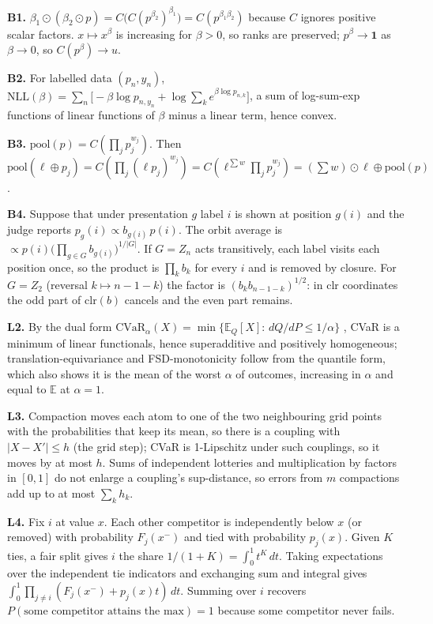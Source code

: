 \documentclass[11pt]{article}
\theoremstyle{definition}
\begin{document}
\textbf{B1.} $\beta_1\odot(\beta_2\odot p)=C\bigl(C(p^{\beta_2})^{\beta_1}\bigr)=C(p^{\beta_1\beta_2})$
because $C$ ignores positive scalar factors. $x\mapsto x^\beta$ is increasing for $\beta>0$, so
ranks are preserved; $p^\beta\to\mathbf 1$ as $\beta\to0$, so $C(p^\beta)\to u$.

\textbf{B2.} For labelled data $(p_n,y_n)$,
$\mathrm{NLL}(\beta)=\sum_n\bigl[-\beta\log p_{n,y_n}+\log\sum_k e^{\beta\log p_{n,k}}\bigr]$, a sum of
log-sum-exp functions of linear functions of $\beta$ minus a linear term, hence convex.

\textbf{B3.} $\mathrm{pool}(p)=C(\prod_j p_j^{w_j})$. Then
$\mathrm{pool}(\ell\oplus p_j)=C(\prod_j(\ell p_j)^{w_j})=C(\ell^{\sum w}\prod_j p_j^{w_j})
=(\sum w)\odot\ell\oplus\mathrm{pool}(p)$.

\textbf{B4.} Suppose that under presentation $g$ label $i$ is shown at position $g(i)$ and the
judge reports $p_g(i)\propto b_{g(i)}\,p(i)$. The orbit average is
$\propto p(i)\bigl(\prod_{g\in G}b_{g(i)}\bigr)^{1/|G|}$. If $G=Z_n$ acts transitively, each label
visits each position once, so the product is $\prod_k b_k$ for every $i$ and is removed by closure.
For $G=Z_2$ (reversal $k\mapsto n-1-k$) the factor is $(b_k b_{n-1-k})^{1/2}$: in clr coordinates
the odd part of $\mathrm{clr}(b)$ cancels and the even part remains.

\textbf{L2.} By the dual form $\mathrm{CVaR}_\alpha(X)=\min\{\mathbb E_Q[X]:\,dQ/dP\le1/\alpha\}$
\cite{rockafellar2000}, CVaR is a minimum of linear functionals, hence superadditive and positively
homogeneous; translation-equivariance and FSD-monotonicity follow from the quantile form, which also
shows it is the mean of the worst $\alpha$ of outcomes, increasing in $\alpha$ and equal to
$\mathbb E$ at $\alpha=1$.

\textbf{L3.} Compaction moves each atom to one of the two neighbouring grid points with the
probabilities that keep its mean, so there is a coupling with $|X-X'|\le h$ (the grid step); CVaR is
1-Lipschitz under such couplings, so it moves by at most $h$. Sums of independent lotteries and
multiplication by factors in $[0,1]$ do not enlarge a coupling's sup-distance, so errors from $m$
compactions add up to at most $\sum_k h_k$.

\textbf{L4.} Fix $i$ at value $x$. Each other competitor is independently below $x$ (or removed)
with probability $F_j(x^-)$ and tied with probability $p_j(x)$. Given $K$ ties, a fair split gives
$i$ the share $1/(1+K)=\int_0^1t^K\,dt$. Taking expectations over the independent tie indicators and
exchanging sum and integral gives $\int_0^1\prod_{j\ne i}(F_j(x^-)+p_j(x)t)\,dt$. Summing over $i$
recovers $P(\text{some competitor attains the max})=1$ because some competitor never fails.
\end{document}
